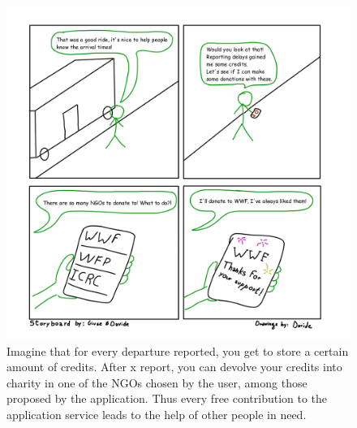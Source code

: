 \documentclass[a4paper, 11pt]{report}
\begin{document}
\begin{figure}[H]
	\centering	
	\includegraphics [width=.5\textwidth]{img/storyboards/storyboard_donations.png}
	\caption{Imagine that for every departure reported, you get to store a certain amount of credits.
	After x report, you can devolve your credits into charity in one of the NGOs chosen by the user, 
	among those proposed by the application. Thus every free contribution to the application service
	 leads to the help of other people in need.}
	\label{fig:d}
\end{figure}
\end{document}
